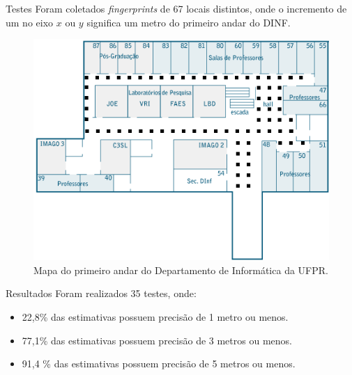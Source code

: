 \documentclass{beamer}
\newlength{\wideitemsep}
\let\olditem\item
\renewcommand{\item}{\setlength{\itemsep}{\wideitemsep}\olditem}
\begin{document}
\begin{frame}{Testes}
Foram coletados \textit{fingerprints} de 67 locais distintos,
  onde o incremento de um no eixo $x$ ou $y$ significa um metro do primeiro andar do DINF.
   
   \begin{figure}[hbt]
  \centering
  \includegraphics[scale=0.4]{../images/TTmapadinf_andar1_492x327.png}
  \caption{Mapa do primeiro andar do Departamento de Informática da UFPR.}
  \label{fig:mapaDinf}
  \end{figure}
\end{frame}

\begin{frame}{Resultados}
 Foram realizados 35 testes, onde:
  \begin{itemize}
      \item 22,8\% das estimativas possuem precisão de 1 metro ou menos.
      \item 77,1\% das estimativas possuem precisão de 3 metros ou menos.
      \item 91,4 \% das estimativas possuem precisão de 5 metros ou menos.
     \end{itemize}
\end{frame}
\end{document}
